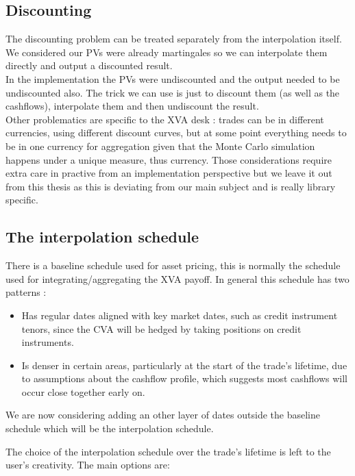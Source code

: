 \documentclass{article}
\begin{document}
\subsection{Discounting}

The discounting problem can be treated separately from the interpolation itself. We considered our PVs were already martingales so we can interpolate them directly and output a discounted result.\\

In the implementation the PVs were undiscounted and the output needed to be undiscounted also. The trick we can use is just to discount them (as well as the cashflows), interpolate them and then undiscount the result.\\

Other problematics are specific to the XVA desk : trades can be in different currencies, using different discount curves, but at some point everything needs to be in one currency for aggregation given that the Monte Carlo simulation happens under a unique measure, thus currency. Those considerations require extra care in practive from an implementation perspective but we leave it out from this thesis as this is deviating from our main subject and is really library specific.

\subsection{The interpolation schedule}

There is a baseline schedule used for asset pricing, this is normally the schedule used for integrating/aggregating the XVA payoff. In general this schedule has two patterns :

\begin{itemize}
    \item Has regular dates aligned with key market dates, such as credit instrument tenors, since the CVA will be hedged by taking positions on credit instruments.
    \item Is denser in certain areas, particularly at the start of the trade's lifetime, due to assumptions about the cashflow profile, which suggests most cashflows will occur close together early on.
\end{itemize}

We are now considering adding an other layer of dates outside the baseline schedule which will be the interpolation schedule.

The choice of the interpolation schedule over the trade's lifetime is left to the user's creativity. The main options are:
\end{document}
